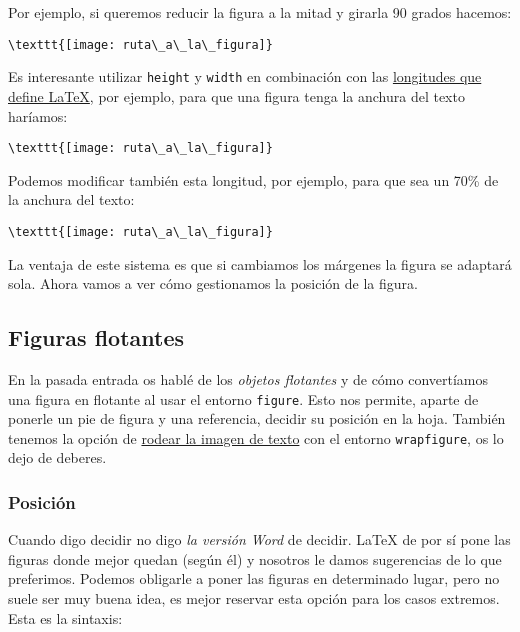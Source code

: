 Por ejemplo, si queremos reducir la figura a la mitad y girarla 90
grados hacemos:

\begin{lstlisting}[language={[latex]tex}]
\texttt{[image: ruta\_a\_la\_figura]}
\end{lstlisting}

Es interesante utilizar \lstinline!height! y \lstinline!width! en
combinación con las
\href{https://en.wikibooks.org/wiki/LaTeX/Lengths}{longitudes que define
LaTeX}, por ejemplo, para que una figura tenga la anchura del texto
haríamos:

\begin{lstlisting}[language={[latex]tex}]
\texttt{[image: ruta\_a\_la\_figura]}
\end{lstlisting}

Podemos modificar también esta longitud, por ejemplo, para que sea un
70\% de la anchura del texto:

\begin{lstlisting}[language={[latex]tex}]
\texttt{[image: ruta\_a\_la\_figura]}
\end{lstlisting}

La ventaja de este sistema es que si cambiamos los márgenes la figura se
adaptará sola. Ahora vamos a ver cómo gestionamos la posición de la
figura.

\subsection{Figuras flotantes}\label{sec:figFlotantes}

En la pasada entrada os hablé de los \emph{objetos flotantes} y de cómo
convertíamos una figura en flotante al usar el entorno
\lstinline!figure!. Esto nos permite, aparte de ponerle un pie de figura
y una referencia, decidir su posición en la hoja. También tenemos la
opción de
\href{http://texblog.org/2010/05/13/wrap-text-around-figures-and-tables/}{rodear
la imagen de texto} con el entorno \lstinline!wrapfigure!, os lo dejo de
deberes.

\subsubsection{Posición}\label{sec:posicion}

Cuando digo decidir no digo \emph{la versión Word} de decidir. LaTeX de
por sí pone las figuras donde mejor quedan (según él) y nosotros le
damos sugerencias de lo que preferimos. Podemos obligarle a poner las
figuras en determinado lugar, pero no suele ser muy buena idea, es mejor
reservar esta opción para los casos extremos. Esta es la sintaxis:

